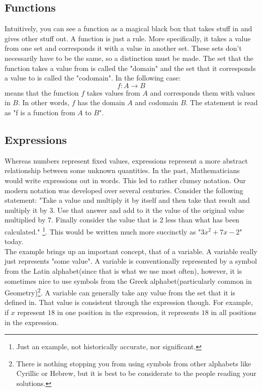 \documentclass[a4paper,12pt]{article}
\begin{document}
\subsection{Functions}
Intuitively, you can see a function as a magical black box that takes stuff in and gives other stuff out. A function is just a rule. More specifically, it takes a value from one set and corresponds it with a value in another set. These sets don't necessarily have to be the same, so a distinction must be made. The set that the function takes a value from is called the "domain" and the set that it corresponds a value to is called the "codomain". In the following case:
$$f:A \rightarrow B$$
means that the function $f$ takes values from $A$ and corresponds them with values in $B$. In other words, $f$ has the domain $A$ and codomain $B$. The statement is read as "f is a function from $A$ to $B$".

\subsection{Expressions}
Whereas numbers represent fixed values, expressions represent a more abstract relationship between some unknown quantities. In the past, Mathematicians would write expressions out in words. This led to rather clumsy notation. Our modern notation was developed over several centuries. Consider the following statement: "Take a value and multiply it by itself and then take that result and multiply it by 3. Use that answer and add to it the value of the original value multiplied by 7. Finally consider the value that is 2 less than what has been calculated." \footnote{Just an example, not historically accurate, nor significant.}. This would be written much more succinctly as "$3x^{2} + 7x - 2$" today. \\

The example brings up an important concept, that of a variable. A variable really just represents "some value". A variable is conventionally represented by a symbol from the Latin alphabet(since that is what we use most often), however, it is sometimes nice to use symbols from the Greek alphabet(particularly common in Geometry)\footnote{There is nothing stopping you from using symbols from other alphabets like Cyrillic or Hebrew, but it is best to be considerate to the people reading your solutions.}. A variable can generally take any value from the set that it is defined in. That value is consistent through the expression though. For example, if $x$ represent $18$ in one position in the expression, it represents $18$ in all positions in the expression. \\
\end{document}
